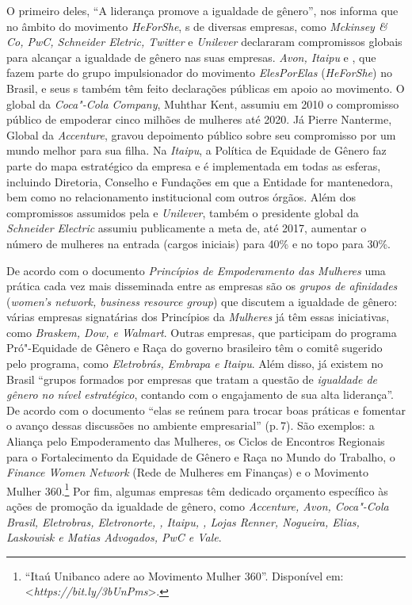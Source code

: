 O primeiro deles, ``A liderança promove a igualdade de gênero'', nos
informa que no âmbito do movimento \emph{HeForShe}, s de diversas
empresas, como \emph{Mckinsey \& Co, PwC, Schneider Eletric, Twitter} e
\emph{Unilever} declararam compromissos globais para alcançar a
igualdade de gênero nas suas empresas. \emph{Avon, Itaipu} e
\emph{}, que fazem parte do grupo impulsionador do movimento
\emph{ElesPorElas} (\emph{HeForShe}) no Brasil, e seus s também têm
feito declarações públicas em apoio ao movimento. O  global da
\emph{Coca"-Cola Company}, Muhthar Kent, assumiu em 2010 o compromisso
público de empoderar cinco milhões de mulheres até 2020. Já Pierre
Nanterme,  Global da \emph{Accenture}, gravou depoimento público
sobre seu compromisso por um mundo melhor para sua filha. Na
\emph{Itaipu}, a Política de Equidade de Gênero faz parte do mapa
estratégico da empresa e é implementada em todas as esferas, incluindo
Diretoria, Conselho e Fundações em que a Entidade for mantenedora, bem
como no relacionamento institucional com outros órgãos. Além dos
compromissos assumidos pela \emph{} e \emph{Unilever}, também o
presidente global da \emph{Schneider Electric} assumiu publicamente a
meta de, até 2017, aumentar o número de mulheres na entrada (cargos
iniciais) para 40\% e no topo para 30\%.

De acordo com o documento \emph{Princípios de Empoderamento das
Mulheres} uma prática cada vez mais disseminada entre as empresas são os
\emph{grupos de afinidades} (\emph{women's network, business resource
group}) que discutem a igualdade de gênero: várias empresas signatárias
dos Princípios da \emph{ Mulheres} já têm essas iniciativas, como
\emph{Braskem, Dow,  e Walmart}. Outras empresas, que participam do
programa Pró"-Equidade de Gênero e Raça do governo brasileiro têm o
comitê sugerido pelo programa, como \emph{Eletrobrás, Embrapa e Itaipu}.
Além disso, já existem no Brasil ``grupos formados por empresas que
tratam a questão de \emph{igualdade de gênero no nível estratégico},
contando com o engajamento de sua alta liderança''. De acordo com o
documento ``elas se reúnem para trocar boas práticas e fomentar o avanço
dessas discussões no ambiente empresarial'' (p.\,7). São exemplos: a
Aliança pelo Empoderamento das Mulheres, os Ciclos de Encontros
Regionais para o Fortalecimento da Equidade de Gênero e Raça no Mundo do
Trabalho, o \emph{Finance Women Network} (Rede de Mulheres em Finanças)
e o Movimento Mulher 360.\footnote{``Itaú Unibanco adere ao Movimento
  Mulher 360''. Disponível em:
  \textless{}\emph{https://bit.ly/3bUnPms}\textgreater{}.}
Por fim, algumas empresas têm dedicado orçamento específico às ações de
promoção da igualdade de gênero, como \emph{Accenture, Avon, Coca"-Cola
Brasil, Eletrobras, Eletronorte, , Itaipu, , Lojas Renner,
Nogueira, Elias, Laskowisk e Matias Advogados, PwC e Vale}.

